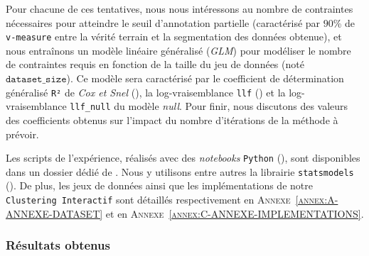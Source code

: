 			Pour chacune de ces tentatives, nous nous intéressons au nombre de contraintes nécessaires pour atteindre le seuil d'annotation partielle (caractérisé par $90$\% de \texttt{v-measure} entre la vérité terrain et la segmentation des données obtenue), et nous entraînons un modèle linéaire généralisé (\textit{GLM}) pour modéliser le nombre de contraintes requis en fonction de la taille du jeu de données (noté $\texttt{dataset\_size}$).
			Ce modèle sera caractérisé par le coefficient de détermination généralisé \texttt{R²} de \textit{Cox et Snel} (\cite{diamond-etal:1990:analysis-binary-data}), la log-vraisemblance \texttt{llf} (\cite{edwards:1992:likelihood}) et la log-vraisemblance \texttt{llf\_null} du modèle \textit{null}.
			Pour finir, nous discutons des valeurs des coefficients obtenus sur l'impact du nombre d'itérations de la méthode à prévoir.

			\setcounter{localCounterOfFootnoteValue}{\value{footnote}}
			\begin{leftBarInformation}
				Les scripts de l'expérience, réalisés avec des \textit{notebooks} \texttt{Python} (\cite{van-rossum-drake:2009:python-reference-manual}), sont disponibles dans un dossier dédié de \cite{schild:2021:cognitivefactory-interactiveclusteringcomparativestudy}.
				Nous y utilisons entre autres la librairie \texttt{statsmodels} \footnotemark (\cite{seabold-perktold:2010:statsmodels-econometric-statistical}).
				De plus, les jeux de données ainsi que les implémentations de notre \texttt{Clustering Interactif} sont détaillés respectivement en \textsc{Annexe~\ref{annex:A-ANNEXE-DATASET}} et en \textsc{Annexe~\ref{annex:C-ANNEXE-IMPLEMENTATIONS}}.
			\end{leftBarInformation}

		\subsubsection{Résultats obtenus}
		
